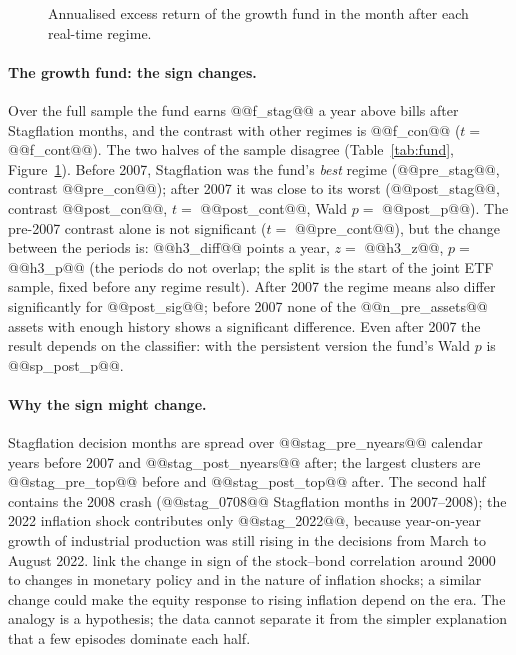\documentclass[11pt,a4paper]{article}
\begin{document}
\begin{figure}[htbp]
\centering
{}
\caption{Annualised excess return of the growth fund in the month after each real-time regime.}
\label{fig:fund}
\end{figure}

\paragraph{The growth fund: the sign changes.} Over the full sample the fund earns @@f_stag@@ a year above bills
after Stagflation months, and the contrast with other regimes is @@f_con@@ ($t=$ @@f_cont@@). The two halves of
the sample disagree (Table~\ref{tab:fund}, Figure~\ref{fig:fund}). Before 2007, Stagflation was the fund's
\emph{best} regime (@@pre_stag@@, contrast @@pre_con@@); after 2007 it was close to its worst (@@post_stag@@,
contrast @@post_con@@, $t=$ @@post_cont@@, Wald $p=$ @@post_p@@). The pre-2007 contrast alone is not significant
($t=$ @@pre_cont@@), but the change between the periods is: @@h3_diff@@ points a year, $z=$ @@h3_z@@, $p=$ @@h3_p@@
(the periods do not overlap; the split is the start of the joint ETF sample, fixed before any regime result). After 2007 the regime means also differ
significantly for @@post_sig@@; before 2007 none of the @@n_pre_assets@@ assets with enough history shows a
significant difference. Even after 2007 the result depends on the classifier: with the persistent version the
fund's Wald $p$ is @@sp_post_p@@.

\paragraph{Why the sign might change.} Stagflation decision months are spread over @@stag_pre_nyears@@ calendar
years before 2007 and @@stag_post_nyears@@ after; the largest clusters are @@stag_pre_top@@ before and
@@stag_post_top@@ after. The second half contains the 2008 crash (@@stag_0708@@ Stagflation months in
2007--2008); the 2022 inflation shock contributes only @@stag_2022@@, because year-on-year growth of industrial
production was still rising in the decisions from March to August 2022. \citet{campbell2020} link the change in
sign of the stock--bond correlation around 2000 to changes in monetary policy and in the nature of inflation
shocks; a similar change could make the equity response to rising inflation depend on the era. The analogy is a hypothesis; the data cannot separate it from the simpler explanation that a few episodes dominate each half.
\end{document}
